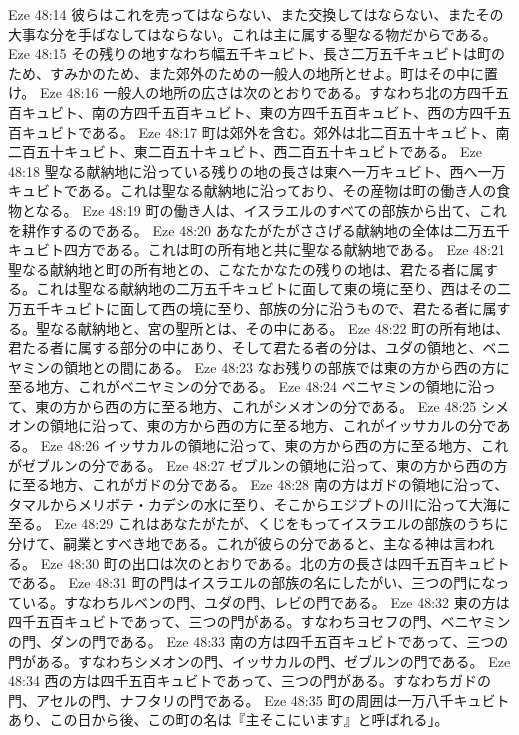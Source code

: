 Eze 48:14  彼らはこれを売ってはならない、また交換してはならない、またその大事な分を手ばなしてはならない。これは主に属する聖なる物だからである。
Eze 48:15  その残りの地すなわち幅五千キュビト、長さ二万五千キュビトは町のため、すみかのため、また郊外のための一般人の地所とせよ。町はその中に置け。
Eze 48:16  一般人の地所の広さは次のとおりである。すなわち北の方四千五百キュビト、南の方四千五百キュビト、東の方四千五百キュビト、西の方四千五百キュビトである。
Eze 48:17  町は郊外を含む。郊外は北二百五十キュビト、南二百五十キュビト、東二百五十キュビト、西二百五十キュビトである。
Eze 48:18  聖なる献納地に沿っている残りの地の長さは東へ一万キュビト、西へ一万キュビトである。これは聖なる献納地に沿っており、その産物は町の働き人の食物となる。
Eze 48:19  町の働き人は、イスラエルのすべての部族から出て、これを耕作するのである。
Eze 48:20  あなたがたがささげる献納地の全体は二万五千キュビト四方である。これは町の所有地と共に聖なる献納地である。
Eze 48:21  聖なる献納地と町の所有地との、こなたかなたの残りの地は、君たる者に属する。これは聖なる献納地の二万五千キュビトに面して東の境に至り、西はその二万五千キュビトに面して西の境に至り、部族の分に沿うもので、君たる者に属する。聖なる献納地と、宮の聖所とは、その中にある。
Eze 48:22  町の所有地は、君たる者に属する部分の中にあり、そして君たる者の分は、ユダの領地と、ベニヤミンの領地との間にある。
Eze 48:23  なお残りの部族では東の方から西の方に至る地方、これがベニヤミンの分である。
Eze 48:24  ベニヤミンの領地に沿って、東の方から西の方に至る地方、これがシメオンの分である。
Eze 48:25  シメオンの領地に沿って、東の方から西の方に至る地方、これがイッサカルの分である。
Eze 48:26  イッサカルの領地に沿って、東の方から西の方に至る地方、これがゼブルンの分である。
Eze 48:27  ゼブルンの領地に沿って、東の方から西の方に至る地方、これがガドの分である。
Eze 48:28  南の方はガドの領地に沿って、タマルからメリボテ・カデシの水に至り、そこからエジプトの川に沿って大海に至る。
Eze 48:29  これはあなたがたが、くじをもってイスラエルの部族のうちに分けて、嗣業とすべき地である。これが彼らの分であると、主なる神は言われる。
Eze 48:30  町の出口は次のとおりである。北の方の長さは四千五百キュビトである。
Eze 48:31  町の門はイスラエルの部族の名にしたがい、三つの門になっている。すなわちルベンの門、ユダの門、レビの門である。
Eze 48:32  東の方は四千五百キュビトであって、三つの門がある。すなわちヨセフの門、ベニヤミンの門、ダンの門である。
Eze 48:33  南の方は四千五百キュビトであって、三つの門がある。すなわちシメオンの門、イッサカルの門、ゼブルンの門である。
Eze 48:34  西の方は四千五百キュビトであって、三つの門がある。すなわちガドの門、アセルの門、ナフタリの門である。
Eze 48:35  町の周囲は一万八千キュビトあり、この日から後、この町の名は『主そこにいます』と呼ばれる」。


